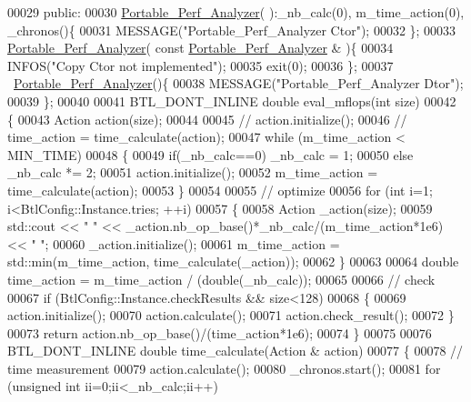 \begin{DoxyCode}
00029 \textcolor{keyword}{public}:
00030   \hyperlink{class_portable___perf___analyzer}{Portable\_Perf\_Analyzer}( ):\_nb\_calc(0), m\_time\_action(0), \_chronos()\{
00031     MESSAGE(\textcolor{stringliteral}{"Portable\_Perf\_Analyzer Ctor"});
00032   \};
00033   \hyperlink{class_portable___perf___analyzer}{Portable\_Perf\_Analyzer}( \textcolor{keyword}{const} \hyperlink{class_portable___perf___analyzer}{Portable\_Perf\_Analyzer} & )\{
00034     INFOS(\textcolor{stringliteral}{"Copy Ctor not implemented"});
00035     exit(0);
00036   \};
00037   ~\hyperlink{class_portable___perf___analyzer}{Portable\_Perf\_Analyzer}()\{
00038     MESSAGE(\textcolor{stringliteral}{"Portable\_Perf\_Analyzer Dtor"});
00039   \};
00040 
00041   BTL\_DONT\_INLINE \textcolor{keywordtype}{double} eval\_mflops(\textcolor{keywordtype}{int} size)
00042   \{
00043     Action action(size);
00044 
00045 \textcolor{comment}{//     action.initialize();}
00046 \textcolor{comment}{//     time\_action = time\_calculate(action);}
00047     \textcolor{keywordflow}{while} (m\_time\_action < MIN\_TIME)
00048     \{
00049       \textcolor{keywordflow}{if}(\_nb\_calc==0) \_nb\_calc = 1;
00050       \textcolor{keywordflow}{else}            \_nb\_calc *= 2;
00051       action.initialize();
00052       m\_time\_action = time\_calculate(action);
00053     \}
00054 
00055     \textcolor{comment}{// optimize}
00056     \textcolor{keywordflow}{for} (\textcolor{keywordtype}{int} i=1; i<BtlConfig::Instance.tries; ++i)
00057     \{
00058       Action \_action(size);
00059       std::cout << \textcolor{stringliteral}{" "} << \_action.nb\_op\_base()*\_nb\_calc/(m\_time\_action*1e6) << \textcolor{stringliteral}{" "};
00060       \_action.initialize();
00061       m\_time\_action = std::min(m\_time\_action, time\_calculate(\_action));
00062     \}
00063 
00064     \textcolor{keywordtype}{double} time\_action = m\_time\_action / (double(\_nb\_calc));
00065 
00066     \textcolor{comment}{// check}
00067     \textcolor{keywordflow}{if} (BtlConfig::Instance.checkResults && size<128)
00068     \{
00069       action.initialize();
00070       action.calculate();
00071       action.check\_result();
00072     \}
00073     \textcolor{keywordflow}{return} action.nb\_op\_base()/(time\_action*1e6);
00074   \}
00075 
00076   BTL\_DONT\_INLINE \textcolor{keywordtype}{double} time\_calculate(Action & action)
00077   \{
00078     \textcolor{comment}{// time measurement}
00079     action.calculate();
00080     \_chronos.start();
00081     \textcolor{keywordflow}{for} (\textcolor{keywordtype}{unsigned} \textcolor{keywordtype}{int} ii=0;ii<\_nb\_calc;ii++)

\end{DoxyCode}
